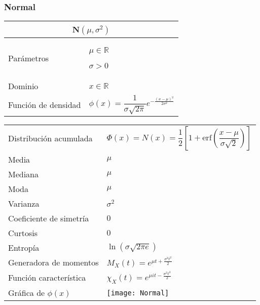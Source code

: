 \documentclass[12pt,a4paper]{article}
\newcommand{\salto}[1][2]{\par\vspace{#1mm}}
\begin{document}
\salto[35]

\subsubsection*{Normal}
\begin{center}
	\begin{tabular}{p{}|p{}}
	\multicolumn{2}{c}{N$(\mu,\sigma^2)$} \\
	\hline
	Parámetros & $\mu\in\mathbb{R}$\par $\sigma > 0$ \\
	Dominio & $x\in\mathbb{R}$ \\
	Función de densidad & $\phi(x) = \dfrac{1}{\sigma\sqrt{2\pi}}e^{-\frac{(x - \mu)^2}{2\sigma^2}}$
	\end{tabular}
	\begin{tabular}{p{}|p{}}
	Distribución acumulada & $\Phi(x) = N(x) = \dfrac{1}{2}\left[ 1 + \text{erf}\left( \dfrac{x - \mu}{\sigma\sqrt{2}} \right) \right]$ \\
	Media & $\mu$ \\
	Mediana & $\mu$ \\
	Moda & $\mu$ \\
	Varianza & $\sigma^2$ \\
	Coeficiente de simetría & $0$ \\
	Curtosis & $0$ \\
	Entropía & $\ln(\sigma\sqrt{2\pi e})$ \\
	Generadora de momentos & $M_X(t) = e^{\mu t + \frac{\sigma^2 t^2}{2}}$ \\
	Función característica & $\chi_X(t) = e^{\mu it - \frac{\sigma^2 t^2}{2}}$ \\
	\vspace{0.25cm}Gráfica de $\phi(x)$ & \vspace{0.1mm}\texttt{[image: Normal]}
	\end{tabular}
\end{center}
\end{document}
